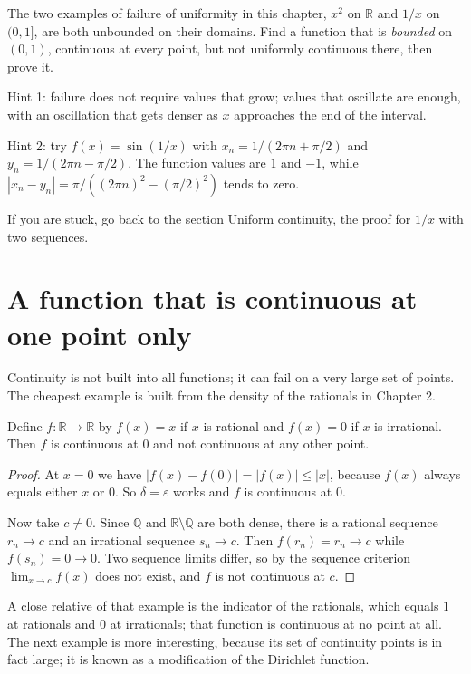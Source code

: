 \begin{tantangan}
The two examples of failure of uniformity in this chapter, $x^{2}$ on $\mathbb{R}$ and
$1/x$ on $(0,1]$, are both unbounded on their domains. Find a function that is
\emph{bounded} on $(0,1)$, continuous at every point, but not uniformly continuous
there, then prove it.

Hint 1: failure does not require values that grow; values that oscillate are enough,
with an oscillation that gets denser as $x$ approaches the end of the interval.

Hint 2: try $f(x)=\sin(1/x)$ with $x_{n}=1/(2\pi n+\pi/2)$ and
$y_{n}=1/(2\pi n-\pi/2)$. The function values are $1$ and $-1$, while
$|x_{n}-y_{n}|=\pi/((2\pi n)^{2}-(\pi/2)^{2})$ tends to zero.

If you are stuck, go back to the section Uniform continuity, the proof for $1/x$ with two
sequences.
\end{tantangan}

\section{A function that is continuous at one point only}

Continuity is not built into all functions; it can fail on a very large set of points. The
cheapest example is built from the density of the rationals in Chapter 2.

\begin{contoh}
Define $f\colon\mathbb{R}\to\mathbb{R}$ by $f(x)=x$ if $x$ is rational and
$f(x)=0$ if $x$ is irrational. Then $f$ is continuous at $0$ and not continuous at any
other point.
\end{contoh}

\begin{proof}
At $x=0$ we have $|f(x)-f(0)|=|f(x)|\le|x|$, because $f(x)$ always equals either $x$ or
$0$. So $\delta=\varepsilon$ works and $f$ is continuous at $0$.

Now take $c\neq 0$. Since $\mathbb{Q}$ and $\mathbb{R}\setminus\mathbb{Q}$
are both dense, there is a rational sequence $r_{n}\to c$ and an irrational sequence
$s_{n}\to c$. Then $f(r_{n})=r_{n}\to c$ while $f(s_{n})=0\to 0$. Two sequence limits
differ, so by the sequence criterion $\lim_{x\to c}f(x)$ does not exist, and $f$ is not
continuous at $c$.
\end{proof}

A close relative of that example is the indicator of the rationals, which equals $1$ at
rationals and $0$ at irrationals; that function is continuous at no point at all. The next
example is more interesting, because its set of continuity points is in fact large; it is
known as a modification of the Dirichlet function.


